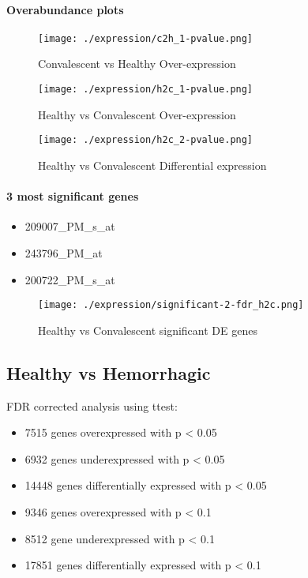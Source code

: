 \documentclass[a4paper]{article}
\begin{document}
\paragraph{Overabundance plots}

\begin{figure}
  \texttt{[image: ./expression/c2h\_1-pvalue.png]}
  \caption{Convalescent vs Healthy Over-expression}
\end{figure}

\begin{figure}
  \texttt{[image: ./expression/h2c\_1-pvalue.png]}
  \caption{Healthy vs Convalescent Over-expression}
\end{figure}

\begin{figure}
  \texttt{[image: ./expression/h2c\_2-pvalue.png]}
  \caption{Healthy vs Convalescent Differential expression}
\end{figure}

\paragraph{3 most significant genes}

\begin{itemize}
  \item 209007\_PM\_s\_at
  \item 243796\_PM\_at
  \item 200722\_PM\_s\_at
\end{itemize}

\begin{figure}
  \texttt{[image: ./expression/significant-2-fdr\_h2c.png]}
  \caption{Healthy vs Convalescent significant DE genes}
\end{figure}

\clearpage
\subsection{Healthy vs Hemorrhagic}

FDR corrected analysis using ttest:

\begin{itemize}
  \item 7515 genes overexpressed with p < 0.05
  \item 6932 genes underexpressed with p < 0.05
  \item 14448 genes differentially expressed with p < 0.05
  \item 9346 genes overexpressed with p < 0.1
  \item 8512 gene underexpressed with p < 0.1
  \item 17851 genes differentially expressed with p < 0.1
\end{itemize}
\end{document}
